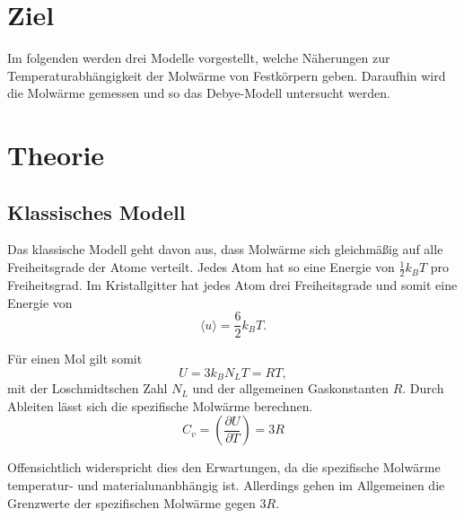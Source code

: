 \section{Ziel}
Im folgenden werden drei Modelle vorgestellt, welche Näherungen zur Temperaturabhängigkeit
der Molwärme von Festkörpern geben. Daraufhin wird die Molwärme gemessen und so das Debye-Modell
untersucht werden.

\section{Theorie}
\subsection{Klassisches Modell}
Das klassische Modell geht davon aus, dass Molwärme sich gleichmäßig auf alle Freiheitsgrade
der Atome verteilt. Jedes Atom hat so eine Energie von $\frac{1}{2}k_BT$ pro Freiheitsgrad.
Im Kristallgitter hat jedes Atom drei Freiheitsgrade und somit eine Energie von
\begin{equation}
  \langle u \rangle = \frac{6}{2}k_BT.
\end{equation}

Für einen Mol gilt somit
\begin{equation}
  U = 3k_B N_L T = RT,
\end{equation}
mit der Loschmidtschen Zahl $N_L$ und der allgemeinen Gaskonstanten $R$.
Durch Ableiten lässt sich die spezifische Molwärme berechnen.
\begin{equation}
  C_v = \left(\frac{\partial U}{\partial T}\right) = 3R
\end{equation}

Offensichtlich widerspricht dies den Erwartungen, da die spezifische Molwärme temperatur-
und materialunanbhängig ist. Allerdings gehen im Allgemeinen die Grenzwerte der spezifischen Molwärme
gegen $3R$.

